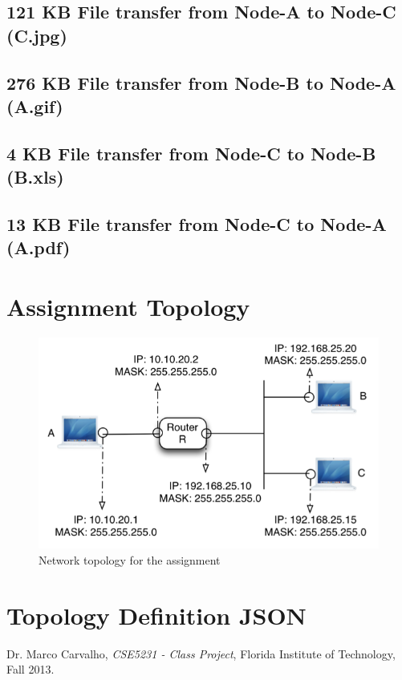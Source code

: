 \documentclass{scrartcl}
\begin{document}
\subsection{121 KB File transfer from Node-A to Node-C (C.jpg)}

\subsection{276 KB File transfer from Node-B to Node-A (A.gif)}

\subsection{4 KB File transfer from Node-C to Node-B (B.xls)}

\subsection{13 KB File transfer from Node-C to Node-A (A.pdf)}


\newpage
\appendix
\section{Assignment Topology} \label{appending:topo-img}
\begin{figure}[H]
\centering
\includegraphics[scale=.65]{topology.png}
\caption{Network topology for the assignment}
\label{fig:topo}
\end{figure}
\newpage
\section{Topology Definition JSON} \label{appendix:topology}


\newpage
%
%
\begin{thebibliography}{30}
 Dr. Marco Carvalho, \emph{CSE5231 - Class Project}, Florida Institute of Technology, Fall 2013.
    
\end{thebibliography}
\end{document}
